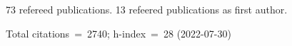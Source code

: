 73 refereed publications. 13 refeered publications as first author.

Total citations~=~2740; h-index~=~28 (2022-07-30)